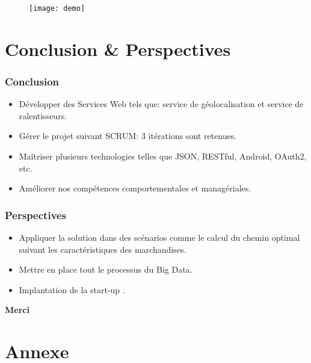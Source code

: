 \documentclass{beamer}
\begin{document}
\begin{frame}
    \begin{center}
    \begin{figure}
        \texttt{[image: demo]}
    \end{figure}
    \end{center}
\end{frame}

\section{Conclusion \& Perspectives}

\begin{frame}
    \frametitle{Conclusion}
    \begin{itemize}
        \item Développer des Services Web tels que: service de géolocalisation et service de ralentisseurs.
        \item Gérer le projet suivant SCRUM: 3 itérations sont retenues.
        \item Maîtriser plusieurs technologies telles que JSON, RESTful, Android, OAuth2, etc.
        \item Améliorer nos compétences comportementales et managériales.
    \end{itemize}
\end{frame}

\begin{frame}
    \frametitle{Perspectives}
    \begin{itemize}
        \item Appliquer la solution dans des scénarios comme le calcul du chemin optimal suivant les caractéristiques des marchandises.
        \item Mettre en place tout le processus du Big Data.
        \item Implantation de la start-up .
    \end{itemize}
\end{frame}

\begin{frame}
    \begin{center}
        \bfseries \Huge
        Merci
    \end{center}
\end{frame}

\section*{Annexe}
\end{document}
